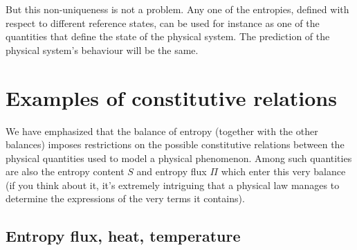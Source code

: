 \documentclass[a4paper,12pt,%
onecolumn,oneside,%
british%
]{memoir}
\renewcommand*{\|}[1][]{\nonscript\:#1\vert\nonscript\:\mathopen{}}
\newcommand*{\yS}{S}
\newcommand*{\yB}{\varPi}
\begin{document}
But this non-uniqueness is not a problem. Any one of the entropies, defined with respect to different reference states, can be used for instance as one of the quantities that define the state of the physical system. The prediction of the physical system's behaviour will be the same.

\section{Examples of constitutive relations}
\label{sec:entropy_constitutive}

We have emphasized that the balance of entropy (together with the other balances) imposes restrictions on the possible constitutive relations between the physical quantities used to model a physical phenomenon. Among such quantities are also the entropy content $\yS$ and entropy flux $\yB$ which enter this very balance (if you think about it, it's extremely intriguing that a physical law manages to determine the expressions of the very terms it contains).

\subsection{Entropy flux, heat, temperature}
\label{sec:entropyflux_const}
\end{document}
